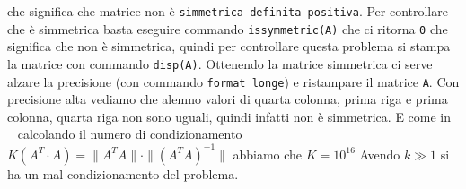 che significa che matrice non è \lstinline{simmetrica definita positiva}. Per controllare che è simmetrica
basta eseguire commando \lstinline{issymmetric(A)} che ci ritorna \lstinline{0} che significa che
non è simmetrica, quindi per controllare questa problema si stampa la matrice con commando \lstinline{disp(A)}.
Ottenendo la matrice simmetrica ci serve alzare la precisione (con commando \lstinline{format longe})
e ristampare il matrice \lstinline{A}. Con precisione alta vediamo che alemno valori di
quarta colonna, prima riga e prima colonna, quarta riga non sono uguali, quindi infatti non è simmetrica.
\newline
E come in ~ calcolando il numero di condizionamento
$K(A^T\cdot A) = \|A^T A\|\cdot\|(A^T A)^{-1}\|$ abbiamo che $K = 10^{16}$
Avendo $k \gg 1$ si ha un mal condizionamento del problema.
